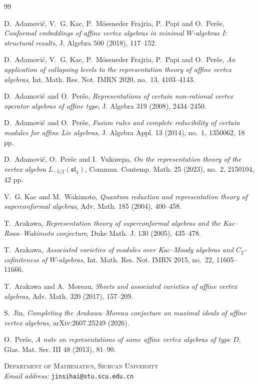 \documentclass[11pt]{article}
\begin{document}
\begin{thebibliography}{99}

D.~Adamovi\'c, V.~G. Kac, P.~M\"oseneder Frajria, P.~Papi and O.~Per\v{s}e,
\emph{Conformal embeddings of affine vertex algebras in minimal $W$-algebras I:
structural results},
J. Algebra 500 (2018), 117--152.

D.~Adamovi\'c, V.~G. Kac, P.~M\"oseneder Frajria, P.~Papi and O.~Per\v{s}e,
\emph{An application of collapsing levels to the representation theory of
affine vertex algebras},
Int. Math. Res. Not. IMRN 2020, no.~13, 4103--4143.

D.~Adamovi\'c and O.~Per\v{s}e,
\emph{Representations of certain non-rational vertex operator algebras of
affine type},
J. Algebra 319 (2008), 2434--2450.

D.~Adamovi\'c and O.~Per\v{s}e,
\emph{Fusion rules and complete reducibility of certain modules for affine
Lie algebras},
J. Algebra Appl. 13 (2014), no.~1, 1350062, 18 pp.

D.~Adamovi\'c, O.~Per\v{s}e and I.~Vukorepa,
\emph{On the representation theory of the vertex algebra
$L_{-5/2}(\mathfrak{sl}_4)$},
Commun. Contemp. Math. 25 (2023), no.~2, 2150104, 42 pp.

V.~G. Kac and M.~Wakimoto,
\emph{Quantum reduction and representation theory of superconformal algebras},
Adv. Math. 185 (2004), 400--458.

T.~Arakawa,
\emph{Representation theory of superconformal algebras and the
Kac--Roan--Wakimoto conjecture},
Duke Math. J. 130 (2005), 435--478.

T.~Arakawa,
\emph{Associated varieties of modules over Kac--Moody algebras and
$C_2$-cofiniteness of $W$-algebras},
Int. Math. Res. Not. IMRN 2015, no.~22, 11605--11666.

T.~Arakawa and A.~Moreau,
\emph{Sheets and associated varieties of affine vertex algebras},
Adv. Math. 320 (2017), 157--209.

S.~Jin,
\emph{Completing the Arakawa--Moreau conjecture on maximal ideals of affine
vertex algebras},
arXiv:2607.25249 (2026).

O.~Per\v{s}e,
\emph{A note on representations of some affine vertex algebras of type $D$},
Glas. Mat. Ser. III 48 (2013), 81--90.

\end{thebibliography}

\bigskip
\noindent\textsc{Department of Mathematics, Sichuan University}\\
\textit{Email address:} \texttt{jinsihai@stu.scu.edu.cn}
\end{document}
